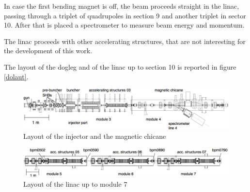 In case the first bending magnet is off, the beam proceeds straight in the linac, passing through a triplet of quadrupoles in section 9 and another triplet in sector 10. After that is placed a spectrometer to measure beam energy and momentum. 

The linac proceeds with other accelerating structures, that are not interesting for the development of this work.

The layout of the dogleg and of the linac up to section 10 is reported in figure \ref{dolaut}.




\begin{landscape}
\begin{center}

\begin{figure}
\centering 
\includegraphics[width=23cm,keepaspectratio]{pictures/Injector}
\caption{Layout of the injector and the magnetic chicane}
\label{injlayout}
\end{figure}

\vspace{20mm}

\begin{figure}
\centering 
\includegraphics[width=23cm,keepaspectratio]{pictures/girder5-7}
\caption{Layout of the linac up to module 7}
\label{linaclayout}
\end{figure}

\end{center}
\end{landscape}



